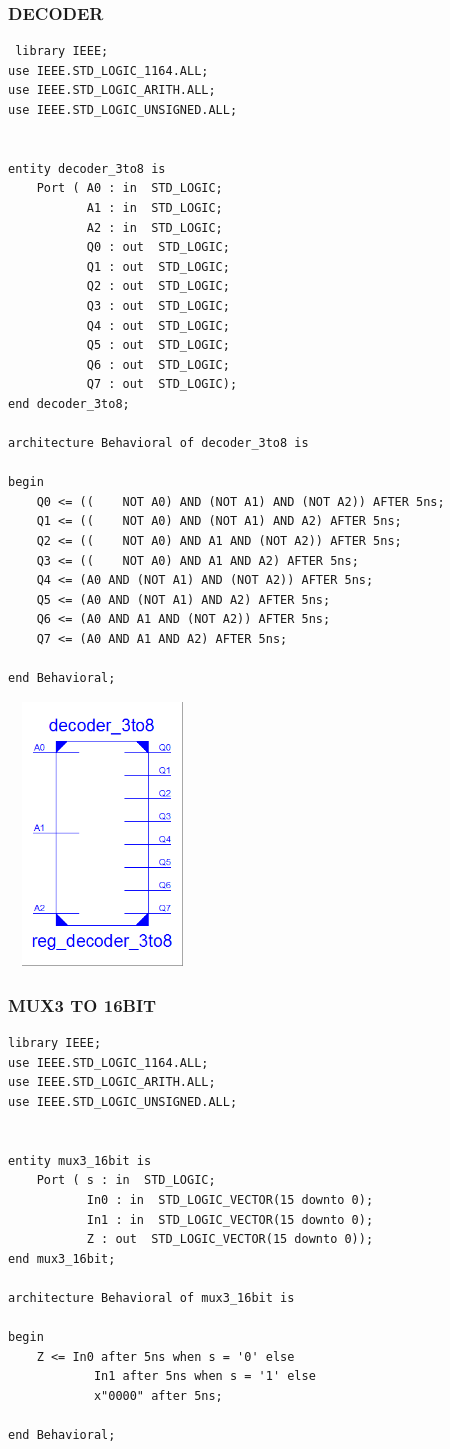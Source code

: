 \documentclass{article}
\begin{document}
\pagebreak
\subsubsection{DECODER}\label{sec:result}

\begin{lstlisting}
 library IEEE;
use IEEE.STD_LOGIC_1164.ALL;
use IEEE.STD_LOGIC_ARITH.ALL;
use IEEE.STD_LOGIC_UNSIGNED.ALL;


entity decoder_3to8 is
    Port ( A0 : in  STD_LOGIC;
           A1 : in  STD_LOGIC;
           A2 : in  STD_LOGIC;
           Q0 : out  STD_LOGIC;
           Q1 : out  STD_LOGIC;
           Q2 : out  STD_LOGIC;
           Q3 : out  STD_LOGIC;
           Q4 : out  STD_LOGIC;
           Q5 : out  STD_LOGIC;
           Q6 : out  STD_LOGIC;
           Q7 : out  STD_LOGIC);
end decoder_3to8;

architecture Behavioral of decoder_3to8 is

begin
	Q0 <= ((	NOT A0) AND (NOT A1) AND (NOT A2)) AFTER 5ns;
	Q1 <= ((	NOT A0) AND (NOT A1) AND A2) AFTER 5ns;
	Q2 <= ((	NOT A0) AND A1 AND (NOT A2)) AFTER 5ns;
	Q3 <= ((	NOT A0) AND A1 AND A2) AFTER 5ns;
	Q4 <= (A0 AND (NOT A1) AND (NOT A2)) AFTER 5ns;
	Q5 <= (A0 AND (NOT A1) AND A2) AFTER 5ns;
	Q6 <= (A0 AND A1 AND (NOT A2)) AFTER 5ns;
	Q7 <= (A0 AND A1 AND A2) AFTER 5ns;

end Behavioral;
\end{lstlisting}

\includegraphics[width=5cm, height=7cm]{decoder.png}
\pagebreak
\subsubsection{MUX3 TO 16BIT}\label{sec:result}

\begin{lstlisting}
library IEEE;
use IEEE.STD_LOGIC_1164.ALL;
use IEEE.STD_LOGIC_ARITH.ALL;
use IEEE.STD_LOGIC_UNSIGNED.ALL;


entity mux3_16bit is
    Port ( s : in  STD_LOGIC;
           In0 : in  STD_LOGIC_VECTOR(15 downto 0);
           In1 : in  STD_LOGIC_VECTOR(15 downto 0);
           Z : out  STD_LOGIC_VECTOR(15 downto 0));
end mux3_16bit;

architecture Behavioral of mux3_16bit is

begin
	Z <= In0 after 5ns when s = '0' else
			In1 after 5ns when s = '1' else
			x"0000" after 5ns;

end Behavioral;

\end{lstlisting}
\end{document}

